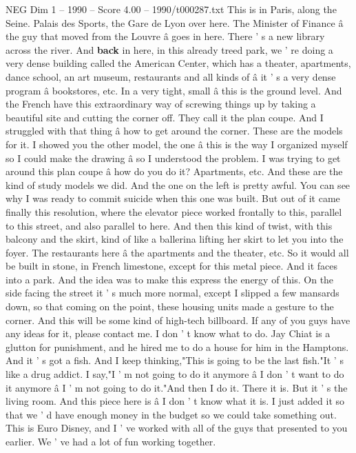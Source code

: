 \begin{textsample}{NEG Dim 1 – 1990 – Score 4.00 – 1990/t000287.txt}
This is in Paris, along the Seine.
Palais des Sports, the Gare de Lyon over here.
The Minister of Finance â the guy that moved from the Louvre â goes in here.
There ' s a new library across the river.
And \textbf{back} in here, in this already treed park, we ' re doing a very dense building called the American Center, which has a theater, apartments, dance school, an art museum, restaurants and all kinds of â it ' s a very dense program â bookstores, etc.
In a very tight, small â this is the ground level.
And the French have this extraordinary way of screwing things up by taking a beautiful site and cutting the corner off.
They call it the plan coupe.
And I struggled with that thing â how to get around the corner.
These are the models for it.
I showed you the other model, the one â this is the way I organized myself so I could make the drawing â so I understood the problem.
I was trying to get around this plan coupe â how do you do it?
Apartments, etc.
And these are the kind of study models we did.
And the one on the left is pretty awful.
You can see why I was ready to commit suicide when this one was built.
But out of it came finally this resolution, where the elevator piece worked frontally to this, parallel to this street, and also parallel to here.
And then this kind of twist, with this balcony and the skirt, kind of like a ballerina lifting her skirt to let you into the foyer.
The restaurants here â the apartments and the theater, etc.
So it would all be built in stone, in French limestone, except for this metal piece.
And it faces into a park.
And the idea was to make this express the energy of this.
On the side facing the street it ' s much more normal, except I slipped a few mansards down, so that coming on the point, these housing units made a gesture to the corner.
And this will be some kind of high-tech billboard.
If any of you guys have any ideas for it, please contact me.
I don ' t know what to do.
Jay Chiat is a glutton for punishment, and he hired me to do a house for him in the Hamptons.
And it ' s got a fish.
And I keep thinking,"This is going to be the last fish."It ' s like a drug addict.
I say,"I ' m not going to do it anymore â I don ' t want to do it anymore â I ' m not going to do it."And then I do it.
There it is.
But it ' s the living room.
And this piece here is â I don ' t know what it is.
I just added it so that we ' d have enough money in the budget so we could take something out.
This is Euro Disney, and I ' ve worked with all of the guys that presented to you earlier.
We ' ve had a lot of fun working together.

\end{textsample}
